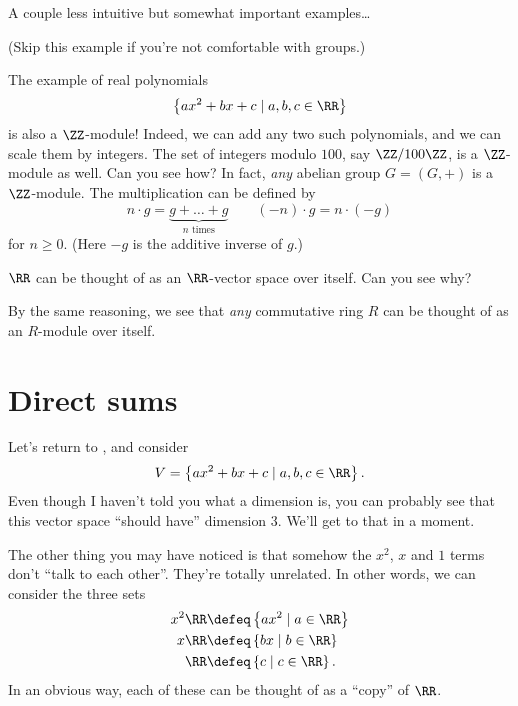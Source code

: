 A couple less intuitive but somewhat important examples\dots
\begin{example}
	(Skip this example if you're not comfortable with groups.)
	\begin{enumerate}[(a)]
		\ii The example of real polynomials
		\[ \left\{ ax^2+bx+c \mid a,b,c \in \RR \right\} \]
		is also a $\ZZ$-module!
		Indeed, we can add any two such polynomials,
		and we can scale them by integers.
		\ii The set of integers modulo $100$, say $\ZZ/100\ZZ$,
		is a $\ZZ$-module as well. Can you see how?
		\ii In fact, \emph{any} abelian group $G = (G,+)$ is a $\ZZ$-module.
		The multiplication can be defined by
		\[ n \cdot g = \underbrace{g+\dots+g}_{\text{$n$ times}}
		\qquad (-n) \cdot g = n \cdot (-g)\]
		for $n \ge 0$. (Here $-g$ is the additive inverse of $g$.)
	\end{enumerate}
\end{example}
\begin{example}
	\listhack
	\begin{enumerate}[(a)]
	\ii $\RR$ can be thought of as an $\RR$-vector space over itself.
	Can you see why?

	\ii By the same reasoning,
	we see that \emph{any} commutative ring $R$ can be thought of
	as an $R$-module over itself.
	\end{enumerate}
\end{example}

\section{Direct sums}
Let's return to , and consider
\[ V = \left\{ ax^2+bx+c \mid a,b,c \in \RR \right\}.  \]
Even though I haven't told you what a dimension is,
you can probably see that this vector space ``should have'' dimension $3$.
We'll get to that in a moment.

The other thing you may have noticed is that somehow
the $x^2$, $x$ and $1$ terms don't ``talk to each other''.
They're totally unrelated.
In other words, we can consider the three sets
\begin{align*}
	x^2\RR &\defeq \left\{ ax^2 \mid a \in \RR \right\} \\
	x\RR &\defeq \left\{ bx \mid b \in \RR \right\} \\
	\RR &\defeq \left\{ c \mid c \in \RR \right\}.
\end{align*}
In an obvious way, each of these can be thought of as a ``copy'' of $\RR$.

